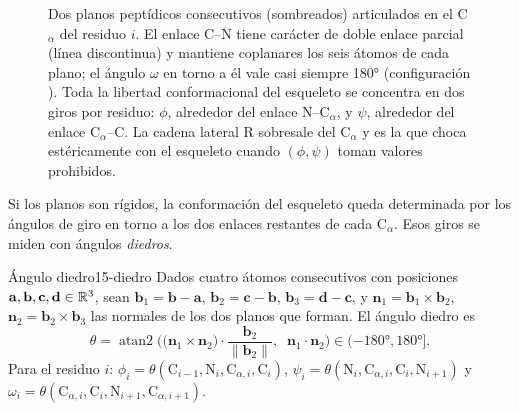 \begin{figure}[t]
\centering

\caption[Esqueleto peptídico y ángulos diedros]{Dos planos peptídicos consecutivos (sombreados) articulados en el C$_\alpha$ del residuo $i$. El enlace C--N tiene carácter de doble enlace parcial (línea discontinua) y mantiene coplanares los seis átomos de cada plano; el ángulo $\omega$ en torno a él vale casi siempre \ang{180} (configuración ). Toda la libertad conformacional del esqueleto se concentra en dos giros por residuo: $\phi$, alrededor del enlace N--C$_\alpha$, y $\psi$, alrededor del enlace C$_\alpha$--C. La cadena lateral R sobresale del C$_\alpha$ y es la que choca estéricamente con el esqueleto cuando $(\phi,\psi)$ toman valores prohibidos.}
\label{fig:15-peptido}
\end{figure}

Si los planos son rígidos, la conformación del esqueleto queda determinada por los ángulos de giro en torno a los dos enlaces restantes de cada C$_\alpha$. Esos giros se miden con ángulos \emph{diedros}.

\begin{definicion}{Ángulo diedro}{15-diedro}
Dados cuatro átomos consecutivos con posiciones $\mathbf a,\mathbf b,\mathbf c,\mathbf d\in\mathbb{R}^3$, sean $\mathbf b_1=\mathbf b-\mathbf a$, $\mathbf b_2=\mathbf c-\mathbf b$, $\mathbf b_3=\mathbf d-\mathbf c$, y $\mathbf n_1=\mathbf b_1\times\mathbf b_2$, $\mathbf n_2=\mathbf b_2\times\mathbf b_3$ las normales de los dos planos que forman. El ángulo diedro es
\begin{equation}\label{eq:15-diedro}
\theta = \operatorname{atan2}\!\Big( \big(\mathbf n_1\times\mathbf n_2\big)\cdot\frac{\mathbf b_2}{\lVert\mathbf b_2\rVert},\;\; \mathbf n_1\cdot\mathbf n_2 \Big)\in(-\ang{180},\ang{180}].
\end{equation}
Para el residuo $i$: $\phi_i=\theta(\mathrm C_{i-1},\mathrm N_i,\mathrm C_{\alpha,i},\mathrm C_i)$, $\psi_i=\theta(\mathrm N_i,\mathrm C_{\alpha,i},\mathrm C_i,\mathrm N_{i+1})$ y $\omega_i=\theta(\mathrm C_{\alpha,i},\mathrm C_i,\mathrm N_{i+1},\mathrm C_{\alpha,i+1})$.
\end{definicion}

\begin{simbolos}
\end{simbolos}

